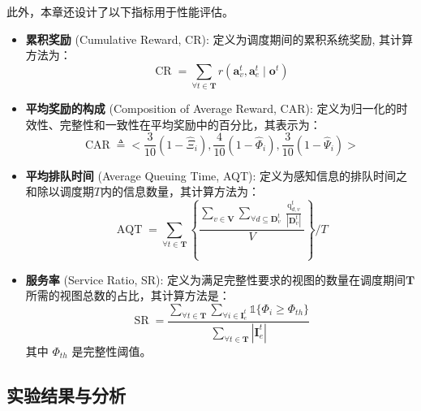 此外，本章还设计了以下指标用于性能评估。
\begin{itemize}
	\item \textbf{累积奖励} (Cumulative Reward, CR): 定义为调度期间的累积系统奖励, 其计算方法为：
		\begin{equation}
			\operatorname{CR} = \sum_{\forall t \in \mathbf{T}} r\left(\boldsymbol{a}_{v}^{t},\boldsymbol{a}_{e}^{t} \mid \boldsymbol{o}^{t}\right)
		\end{equation}
	\item \textbf{平均奖励的构成} (Composition of Average Reward, CAR): 定义为归一化的时效性、完整性和一致性在平均奖励中的百分比，其表示为：
		\begin{equation}
			\operatorname{CAR} \triangleq <\frac{3}{10}(1-\hat{\Xi}_{i}),\frac{4}{10}(1-\hat{\Phi}_{i}), \frac{3}{10}(1-\hat{\Psi}_{i})>
		\end{equation}
	\item \textbf{平均排队时间} (Average Queuing Time, AQT): 定义为感知信息的排队时间之和除以调度期$T$内的信息数量，其计算方法为：
		\begin{equation}
			\operatorname{AQT} =\sum_{\forall t \in \mathbf{T}} \left \{ \frac{\sum_{v \in \mathbf{V}} \sum_{\forall d \subseteq \mathbf{D}_{v}^t} \frac{\operatorname{q}_{d, v}^t}{|\mathbf{D}_{v}^t|} }{V} \right\} \bigg/ T
		\end{equation}
	\item \textbf{服务率} (Service Ratio, SR): 定义为满足完整性要求的视图的数量在调度期间$\mathbf{T}$所需的视图总数的占比，其计算方法是：
		\begin{equation}
			\operatorname{SR} = \frac{\sum_{\forall t \in \mathbf{T}}\sum_{\forall i \in \mathbf{I}_e^t} \mathds{1}\{\Phi_{i} \geq \Phi_{th}\}}{ \sum_{\forall t \in \mathbf{T}} |\mathbf{I}_e^t|}
		\end{equation}
	其中 $\Phi_{th}$ 是完整性阈值。
\end{itemize}

\subsection[\hspace{-2pt}实验结果与分析]{{ \hspace{-8pt}实验结果与分析}}

